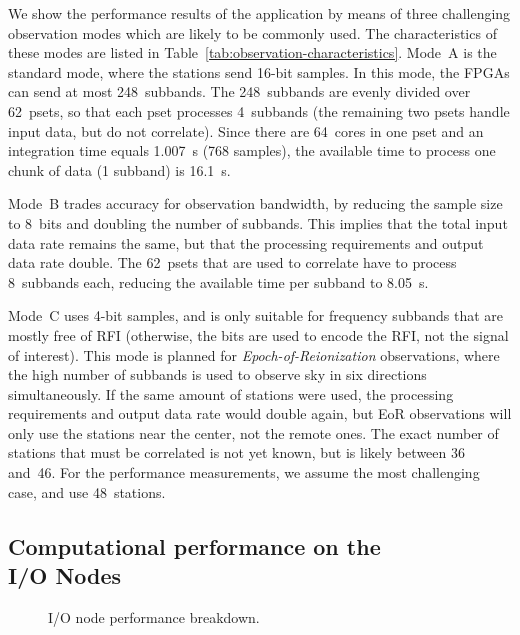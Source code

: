 \documentclass{sig-alternate}
\begin{document}
We show the performance results of the application by means of three
challenging observation modes which are likely to be commonly used.
The characteristics of these modes are listed in
Table~\ref{tab:observation-characteristics}.
Mode~\textsf{A} is the standard mode, where the stations send 16-bit samples.
In this mode, the FPGAs can send at most 248~subbands.
The 248~subbands are evenly divided over 62~psets, so that each pset processes
4~subbands (the remaining two psets handle input data, but do not correlate).
Since there are 64~cores in one pset and an integration time equals 1.007~s (768 samples),
the available time to process one chunk of data (1 subband) is 16.1~s.

Mode~\textsf{B} trades accuracy for observation bandwidth, by reducing the
sample size to 8~bits and doubling the number of subbands.
This implies that the total input data rate remains the same, but that the
processing requirements and output data rate double.
The 62~psets that are used to correlate have to process 8~subbands each,
reducing the available time per subband to 8.05~s.

Mode~\textsf{C} uses 4-bit samples, and is only suitable for frequency
subbands that are mostly free of RFI (otherwise, the bits are used to encode
the RFI, not the signal of interest).
This mode is planned for \emph{Epoch-of-Reionization} observations, where the high number of subbands
is used to observe sky in six directions simultaneously.
If the same amount of stations were used, the processing requirements and
output data rate would double again, but EoR observations will only use the
stations near the center, not the remote ones.
The exact number of stations that must be correlated is not yet known, but is
likely between 36 and~46.
For the performance measurements, we assume the most challenging case, and use 48~stations.


\subsection{Computational performance on the \\ I/O Nodes}
\label{sec:ION-performance}

\begin{figure}[ht]
\hfill
{}
\caption{I/O node performance breakdown.}
\label{fig:ion-performance}
\end{figure}
\end{document}
